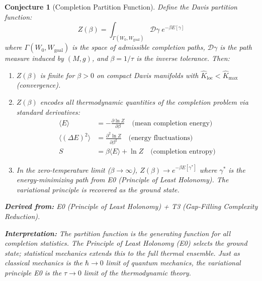 \documentclass[11pt,letterpaper]{article}
\newtheorem{conjecture}{Conjecture}[section]
\newcommand{\Khat}{\hat{K}}
\begin{document}
\begin{conjecture}[Completion Partition Function]\label{conj:partition}
Define the \emph{Davis partition function}:
\begin{equation}\label{eq:partition}
    Z(\beta) = \int_{\Gamma(W_0, W_{\mathrm{goal}})} 
    \mathcal{D}\gamma \; e^{-\beta E[\gamma]}
\end{equation}
where $\Gamma(W_0, W_{\mathrm{goal}})$ is the space of admissible completion 
paths, $\mathcal{D}\gamma$ is the path measure induced by $(M, g)$, and 
$\beta = 1/\tau$ is the inverse tolerance. Then:

\begin{enumerate}[label=(\alph*)]
    \item $Z(\beta)$ is finite for $\beta > 0$ on compact Davis manifolds 
    with $\Khat_{\mathrm{loc}} < \Khat_{\max}$ (convergence).
    
    \item $Z(\beta)$ encodes all thermodynamic quantities of the completion 
    problem via standard derivatives:
    \begin{align}
        \langle E \rangle &= -\frac{\partial \ln Z}{\partial \beta} 
        \quad \text{(mean completion energy)} \label{eq:mean_energy}\\
        \langle (\Delta E)^2 \rangle &= \frac{\partial^2 \ln Z}{\partial \beta^2} 
        \quad \text{(energy fluctuations)} \label{eq:fluctuations}\\
        S &= \beta \langle E \rangle + \ln Z 
        \quad \text{(completion entropy)} \label{eq:entropy}
    \end{align}
    
    \item In the zero-temperature limit ($\beta \to \infty$), 
    $Z(\beta) \to e^{-\beta E[\gamma^*]}$ where $\gamma^*$ is the 
    energy-minimizing path from E0 (Principle of Least Holonomy). The 
    variational principle is recovered as the ground state.
\end{enumerate}

\textbf{Derived from:} E0 (Principle of Least Holonomy) + T3 (Gap-Filling 
Complexity Reduction).

\textbf{Interpretation:} The partition function is the generating function 
for all completion statistics. The Principle of Least Holonomy (E0) selects 
the ground state; statistical mechanics extends this to the full thermal 
ensemble. Just as classical mechanics is the $\hbar \to 0$ limit of quantum 
mechanics, the variational principle E0 is the $\tau \to 0$ limit of the 
thermodynamic theory.
\end{conjecture}
\end{document}
